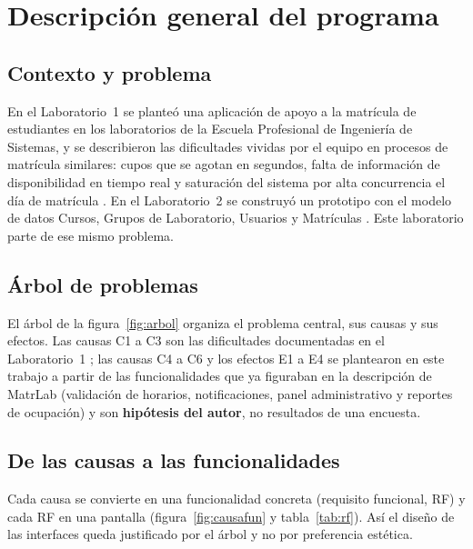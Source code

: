 \section{Descripción general del programa}
\label{sec:descripcion}

\subsection{Contexto y problema}
En el Laboratorio~1 se planteó una aplicación de apoyo a la matrícula de estudiantes en los laboratorios de la Escuela Profesional de Ingeniería de Sistemas, y se describieron las dificultades vividas por el equipo en procesos de matrícula similares: cupos que se agotan en segundos, falta de información de disponibilidad en tiempo real y saturación del sistema por alta concurrencia el día de matrícula \cite{lab1}. En el Laboratorio~2 se construyó un prototipo con el modelo de datos Cursos, Grupos de Laboratorio, Usuarios y Matrículas \cite{lab2}. Este laboratorio parte de ese mismo problema.

\subsection{Árbol de problemas}
El árbol de la figura~\ref{fig:arbol} organiza el problema central, sus causas y sus efectos. Las causas C1 a C3 son las dificultades documentadas en el Laboratorio~1 \cite{lab1}; las causas C4 a C6 y los efectos E1 a E4 se plantearon en este trabajo a partir de las funcionalidades que ya figuraban en la descripción de MatrLab (validación de horarios, notificaciones, panel administrativo y reportes de ocupación) y son \textbf{hipótesis del autor}, no resultados de una encuesta.


\subsection{De las causas a las funcionalidades}
Cada causa se convierte en una funcionalidad concreta (requisito funcional, RF) y cada RF en una pantalla (figura~\ref{fig:causafun} y tabla~\ref{tab:rf}). Así el diseño de las interfaces queda justificado por el árbol y no por preferencia estética.


